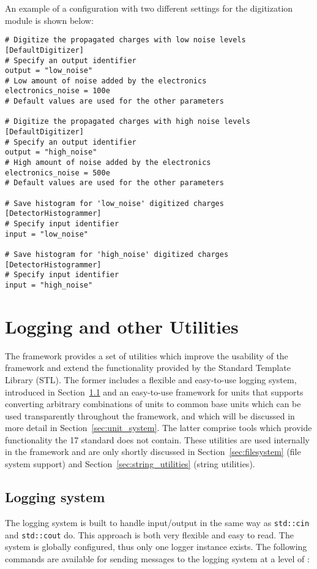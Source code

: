 An example of a configuration with two different settings for the digitization module is shown below:
\begin{verbatim}
# Digitize the propagated charges with low noise levels
[DefaultDigitizer]
# Specify an output identifier
output = "low_noise"
# Low amount of noise added by the electronics
electronics_noise = 100e
# Default values are used for the other parameters

# Digitize the propagated charges with high noise levels
[DefaultDigitizer]
# Specify an output identifier
output = "high_noise"
# High amount of noise added by the electronics
electronics_noise = 500e
# Default values are used for the other parameters

# Save histogram for 'low_noise' digitized charges
[DetectorHistogrammer]
# Specify input identifier
input = "low_noise"

# Save histogram for 'high_noise' digitized charges
[DetectorHistogrammer]
# Specify input identifier
input = "high_noise"
\end{verbatim}


\section{Logging and other Utilities}
\label{sec:logging_utilities}
The \apsq framework provides a set of utilities which improve the usability of the framework and extend the functionality provided by the \CPP Standard Template Library (STL).
The former includes a flexible and easy-to-use logging system, introduced in Section~\ref{sec:logger} and an easy-to-use framework for units that supports converting arbitrary combinations of units to common base units which can  be used transparently throughout the framework, and which will be discussed in more detail in Section~\ref{sec:unit_system}.
The latter comprise tools which provide functionality the {\CPP}17 standard does not contain.
These utilities are used internally in the framework and are only shortly discussed in Section~\ref{sec:filesystem} (file system support) and Section~\ref{sec:string_utilities} (string utilities).

\subsection{Logging system}
\label{sec:logger}
The logging system is built to handle input/output in the same way as \texttt{std::cin} and \texttt{std::cout} do.
This approach is both very flexible and easy to read.
The system is globally configured, thus only one logger instance exists.
The following commands are available for sending messages to the logging system at a level of :

